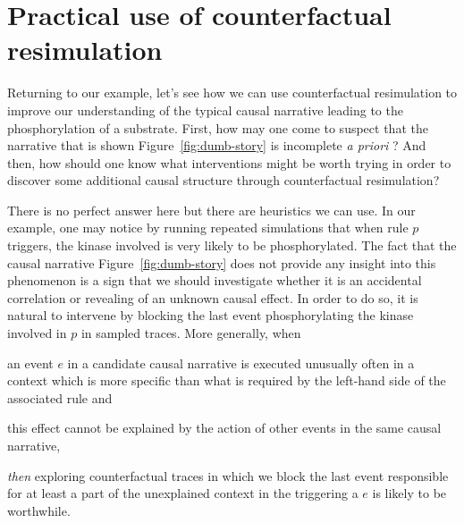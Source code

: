 \section{Practical use of  counterfactual resimulation}
\label{sec:cosim-practice}

Returning to our example, let's see how we can use counterfactual
resimulation to improve our understanding of the typical causal
narrative leading to the phosphorylation of a substrate. First, how
may one come to suspect that the narrative that is shown
Figure~\ref{fig:dumb-story} is incomplete \textit{a priori} ? And
then, how should one know what interventions might be worth trying in
order to discover some additional causal structure through
counterfactual resimulation?

There is no perfect answer here but there are heuristics we can
use. In our example, one may notice by running repeated simulations
that when rule $p$ triggers, the kinase involved is very likely to be
phosphorylated. The fact that the causal narrative
Figure~\ref{fig:dumb-story} does not provide any insight into this
phenomenon is a sign that we should investigate whether it is
an accidental correlation or revealing of an unknown causal effect. In
order to do so, it is natural to intervene by blocking the last event
phosphorylating the kinase involved in $p$ in sampled traces. More
generally, when
\begin{inparaenum}[(i)]
\item an event $e$ in a candidate causal narrative is executed
  unusually often in a context which is more specific than what is
  required by the left-hand side of the associated rule and
\item this effect cannot be explained by the action of other events in
  the same causal narrative,
\end{inparaenum}
\textit{then} exploring counterfactual traces in which we block the last event
responsible for at least a part of the unexplained context in the
triggering a $e$ is likely to be worthwhile.

